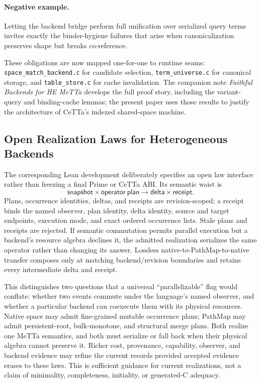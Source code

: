 \documentclass[11pt]{article}
\newcommand{\code}[1]{\texttt{#1}}
\newcommand{\CeTTa}{\textup{CeTTa}}
\newcommand{\PathMap}{\textup{PathMap}}
\begin{document}
\paragraph{Negative example.}
Letting the backend bridge perform full unification over serialized query
terms invites exactly the binder-hygiene failures that arise when
canonicalization preserves shape but breaks co-reference.

These obligations are now mapped one-for-one to runtime seams:
\code{space\_match\_backend.c} for candidate selection, \code{term\_universe.c}
for canonical storage, and \code{table\_store.c} for cache invalidation.  The
companion note \emph{Faithful Backends for HE MeTTa} develops the full proof
story, including the variant-query and binding-cache lemmas; the present
paper uses those results to justify the architecture of \CeTTa{}'s indexed
shared-space machine.

\subsection{Open Realization Laws for Heterogeneous Backends}
\label{sec:operator-realization}

The corresponding Lean development deliberately specifies an open law
interface rather than freezing a final Prime or \CeTTa{} ABI.  Its semantic
waist is
\[
  \mathsf{snapshot}\times\mathsf{operator\ plan}
    \longrightarrow \mathsf{delta}\times\mathsf{receipt}.
\]
Plans, occurrence identities, deltas, and receipts are revision-scoped; a
receipt binds the named observer, plan identity, delta identity, source and
target endpoints, execution mode, and exact ordered occurrence lists.  Stale
plans and receipts are rejected.  If semantic commutation permits parallel
execution but a backend's resource algebra declines it, the admitted
realization serializes the same operator rather than changing its answer.
Lossless native-to-\PathMap{}-to-native transfer composes only at matching
backend/revision boundaries and retains every intermediate delta and receipt.

This distinguishes two questions that a universal ``parallelizable'' flag
would conflate: whether two events commute under the language's named
observer, and whether a particular backend can coexecute them with its
physical resources.  Native space may admit fine-grained mutable occurrence
plans; \PathMap{} may admit persistent-root, bulk-monotone, and structural
merge plans.  Both realize one MeTTa semantics, and both must serialize or
fall back when their physical algebra cannot preserve it.  Richer cost,
provenance, capability, observer, and backend evidence may refine the current
records provided accepted evidence erases to these laws.  This is sufficient
guidance for current realizations, not a claim of minimality, completeness,
initiality, or generated-C adequacy.
\end{document}
